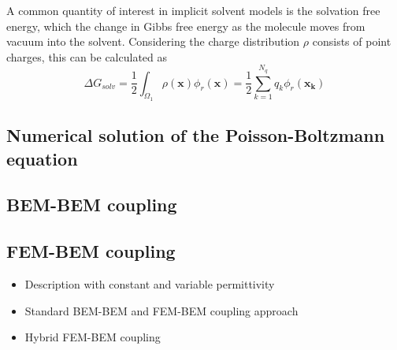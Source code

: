 A common quantity of interest in implicit solvent models is the solvation free energy, which the change in Gibbs free energy as the molecule moves from vacuum into the solvent. Considering the charge distribution $\rho$ consists of point charges, this can be calculated as
%
\begin{equation}\label{eq:dG}
\Delta G_{solv} = \frac{1}{2}\int_{\Omega_1} \rho(\mathbf{x})\phi_{r}(\mathbf{x}) = \frac{1}{2}\sum_{k=1}^{N_q} q_k\phi_r(\mathbf{x_k})
\end{equation}

\subsection*{\sffamily \large Numerical solution of the Poisson-Boltzmann equation}

\subsection*{\sffamily \large BEM-BEM coupling}



\subsection*{\sffamily \large FEM-BEM coupling}

\begin{itemize}
    \item Description with constant and variable permittivity 
    \item Standard BEM-BEM and FEM-BEM coupling approach
    \item Hybrid FEM-BEM coupling
\end{itemize}
